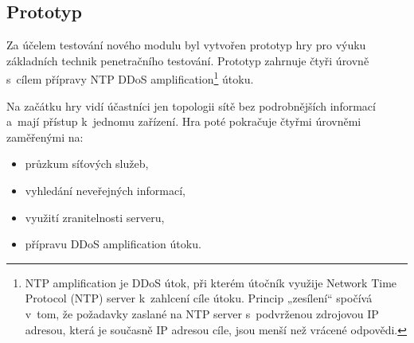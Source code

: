 \documentclass[
  digital, %
  oneside, %
  table,   %
  nolof,     %
  nolot,     %
  nocover
]{fithesis3}
\begin{document}
\subsection{Prototyp}
Za účelem testování nového modulu byl vytvořen prototyp hry pro výuku základních technik penetračního testování. Prototyp zahrnuje čtyři úrovně s~cílem přípravy NTP DDoS amplification\footnote{NTP amplification je DDoS útok, při kterém útočník využije Network Time Protocol (NTP) server k~zahlcení cíle útoku. Princip „zesílení“ spočívá v~tom, že požadavky zaslané na NTP server s~podvrženou zdrojovou IP adresou, která je současně IP adresou cíle, jsou menší než vrácené odpovědi.} útoku.\par
Na začátku hry vidí účastníci jen topologii sítě bez podrobnějších informací a~mají přístup k~jednomu zařízení. Hra poté pokračuje čtyřmi úrovněmi zaměřenými na:
\begin{itemize}
  \item průzkum síťových služeb,
  \item vyhledání neveřejných informací,
  \item využití zranitelnosti serveru,
  \item přípravu DDoS amplification útoku.
\end{itemize}
\end{document}
